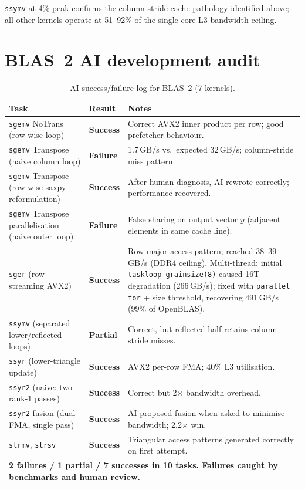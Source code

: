 \documentclass[11pt,a4paper]{article}
\begin{document}
\noindent \texttt{ssymv} at 4\% peak confirms the column-stride cache pathology identified above; all other kernels operate at 51--92\% of the single-core L3 bandwidth ceiling.

\section{BLAS~2 AI development audit}

\begin{table}[h]
\centering
\caption{AI success/failure log for BLAS~2 (7 kernels).}
\label{tab:blas2_ai_audit}
\small
\begin{tabular}{p{4.5cm}p{2cm}p{7cm}}
\toprule
Task & Result & Notes \\
\midrule
\texttt{sgemv} NoTrans (row-wise loop)
  & \textbf{Success}
  & Correct AVX2 inner product per row; good prefetcher behaviour. \\
\texttt{sgemv} Transpose (naive column loop)
  & \textbf{\color{red}Failure}
  & 1.7\,GB/s vs.\ expected 32\,GB/s; column-stride miss pattern. \\
\texttt{sgemv} Transpose (row-wise saxpy reformulation)
  & \textbf{Success}
  & After human diagnosis, AI rewrote correctly; performance recovered. \\
\texttt{sgemv} Transpose parallelisation (naive outer loop)
  & \textbf{\color{red}Failure}
  & False sharing on output vector $y$ (adjacent elements in same cache line). \\
\texttt{sger} (row-streaming AVX2)
  & \textbf{Success}
  & Row-major access pattern; reached 38--39\,GB/s (DDR4 ceiling). Multi-thread: initial \texttt{taskloop grainsize(8)} caused 16T degradation (266\,GB/s); fixed with \texttt{parallel for} + size threshold, recovering 491\,GB/s (99\% of OpenBLAS). \\
\texttt{ssymv} (separated lower/reflected loops)
  & \textbf{Partial}
  & Correct, but reflected half retains column-stride misses. \\
\texttt{ssyr} (lower-triangle update)
  & \textbf{Success}
  & AVX2 per-row FMA; 40\% L3 utilisation. \\
\texttt{ssyr2} (naive: two rank-1 passes)
  & \textbf{Success}
  & Correct but 2$\times$ bandwidth overhead. \\
\texttt{ssyr2} fusion (dual FMA, single pass)
  & \textbf{Success}
  & AI proposed fusion when asked to minimise bandwidth; 2.2$\times$ win. \\
\texttt{strmv}, \texttt{strsv}
  & \textbf{Success}
  & Triangular access patterns generated correctly on first attempt. \\
\midrule
\multicolumn{3}{l}{\textbf{2 failures / 1 partial / 7 successes in 10 tasks. Failures caught by benchmarks and human review.}} \\
\bottomrule
\end{tabular}
\end{table}
\end{document}
